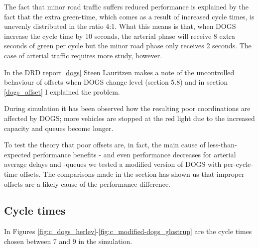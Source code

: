 The fact that minor road traffic suffers reduced performance is explained by the fact that the extra green-time, which comes as a result of increased cycle times, is unevenly distributed in the ratio 4:1. What this means is that, when DOGS increase the cycle time by 10 seconds, the arterial phase will receive 8 extra seconds of green per cycle but the minor road phase only receives 2 seconds. 
The case of arterial traffic requires more study, however.

In the DRD report \ref{dogs} Steen Lauritzen makes a note of the uncontrolled behaviour of offsets when DOGS change level (section 5.8) and in section \ref{dogs_offset} I explained the problem.

During simulation it has been observed how the resulting poor coordinations are affected by DOGS; more vehicles are stopped at the red light due to the increased capacity and queues become longer. 

To test the theory that poor offsets are, in fact, the main cause of less-than-expected performance benefits - and even performance decreases for arterial average delays and -queues we tested a modified version of DOGS with per-cycle-time offsets. The comparisons made in the section has shown us that improper offsets are a likely cause of the performance difference.

\subsection*{Cycle times}
In Figures \ref{fig:c_dogs_herlev}-\ref{fig:c_modified-dogs_glostrup} are the cycle times chosen between 7 and 9 in the simulation.

